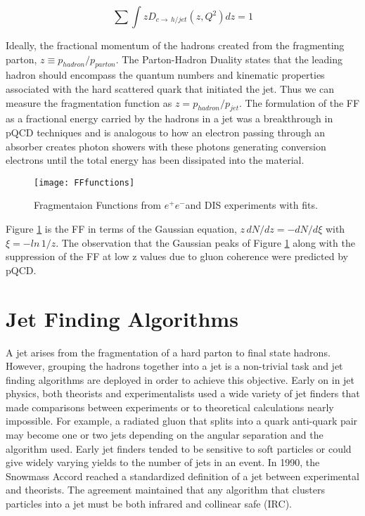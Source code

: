 \begin{equation}
\sum \int z D_{c \rightarrow \, h/jet} (z,Q^{2})dz = 1
\label{eq:FFRule}
\end{equation}

\noindent
Ideally, the fractional momentum of the hadrons created from the fragmenting parton, $z \equiv p_{hadron} / p_{parton}$.  The Parton-Hadron Duality\cite{Jenkovszky:2012dc} states that the leading hadron should encompass the quantum numbers and kinematic properties associated with the hard scattered quark that initiated the jet.  Thus we can measure the fragmentation function as $z = p_{hadron} / p_{jet}$.  The formulation of the FF as a fractional energy carried by the hadrons in a jet was a breakthrough in pQCD techniques and is analogous to how an electron passing through an absorber creates photon showers with these photons generating conversion electrons until the total energy has been dissipated into the material.

\begin{figure}[h]
\texttt{[image: FFfunctions]}
\centering
\caption{Fragmentaion Functions from $e^{+}e^{-}$and DIS experiments with fits\cite{rak_tannenbaum_2013}.}
\label{fig:FFfunc}
\end{figure}


Figure \ref{fig:FFfunc} is the FF in terms of the Gaussian equation, $z \, dN/dz = - dN /d \xi $ with $\xi = -ln  \,1/z$. The observation that the Gaussian peaks of Figure \ref{fig:FFfunc} along with the suppression of the FF at low z values due to gluon coherence were predicted by pQCD. 

\section{Jet Finding Algorithms}

A jet arises from the fragmentation of a hard parton to final state hadrons.  However, grouping the hadrons together into a jet is a non-trivial task and jet finding algorithms are deployed in order to achieve this objective.  Early on in jet physics, both theorists and experimentalists used a wide variety of jet finders that made comparisons between experiments or to theoretical calculations nearly impossible\cite{Atkin:2015msa}.  For example, a radiated gluon that splits into a quark anti-quark pair may become one or two jets depending on the angular separation and the algorithm used.  Early jet finders tended to be sensitive to soft particles or could give widely varying yields to the number of jets in an event.  In 1990, the Snowmass Accord\cite{Huth:217490} reached a standardized definition of a jet between experimental and theorists.  The agreement maintained that any algorithm that clusters particles into a jet must be both infrared and collinear safe (IRC).  

